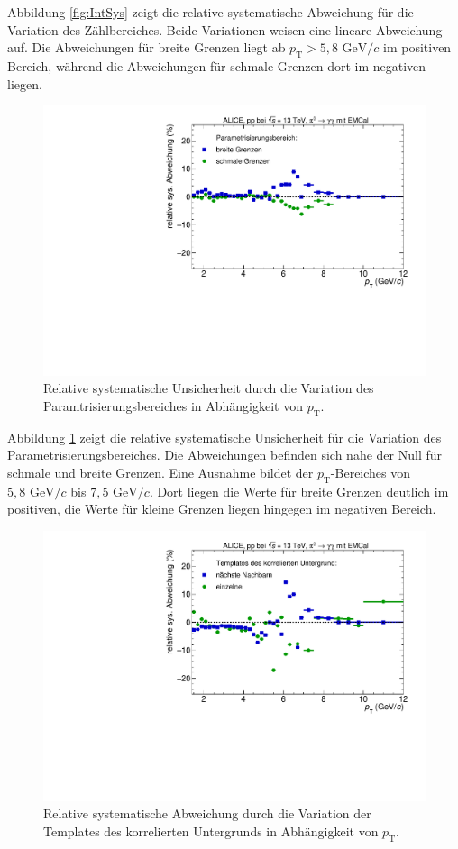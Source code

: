 \newline
Abbildung \ref{fig:IntSys} zeigt die relative systematische Abweichung für die Variation des Zählbereiches.
Beide Variationen weisen eine lineare Abweichung auf.
Die Abweichungen für breite Grenzen liegt ab $p_\text{T} > 5,8 \text{ GeV}/c$ im positiven Bereich, während die Abweichungen für schmale Grenzen dort im negativen liegen.
\begin{figure}[t!]
\centering
\includegraphics[width=.65\linewidth]{YieldsSysUncerFitRange_Data_2016.pdf}
\caption{Relative systematische Unsicherheit durch die Variation des Paramtrisierungsbereiches in Abhängigkeit von $p_\text{T}$.}
\label{fig:ParamSys}
\end{figure}
\newline
Abbildung \ref{fig:ParamSys} zeigt die relative systematische Unsicherheit für die Variation des Parametrisierungsbereiches.
Die Abweichungen befinden sich nahe der Null für schmale und breite Grenzen.
Eine Ausnahme bildet der $p_\text{T}$-Bereiches von $5,8 \text{ GeV}/c$ bis $7,5 \text{ GeV}/c$.
Dort liegen die Werte für breite Grenzen deutlich im positiven, die Werte für kleine Grenzen liegen hingegen im negativen Bereich.
\begin{figure}[t!]
\centering
\includegraphics[width=.65\linewidth]{YieldsSysUncerBkgVariation_Data_2016.pdf}
\caption{Relative systematische Abweichung durch die Variation der Templates des korrelierten Untergrunds in Abhängigkeit von $p_\text{T}$.}
\label{fig:BkgSys}
\end{figure}
